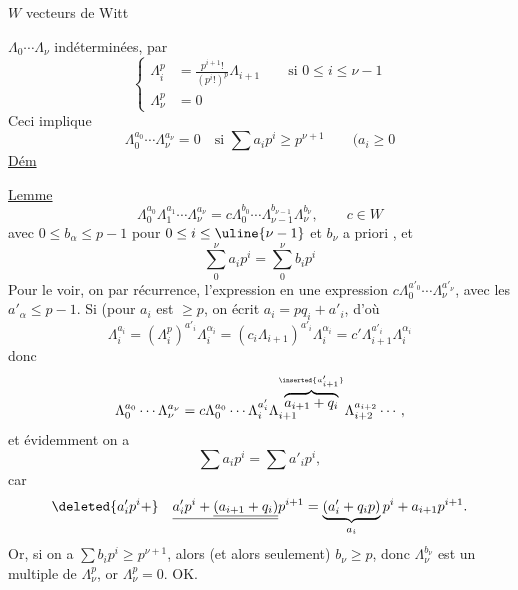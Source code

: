 $W$ vecteurs de Witt

$\Lambda_0\cdots\Lambda_\nu$ indéterminées,  par
\[
\left\{\begin{aligned}
\Lambda_i^p&=\frac{p^{i+1}!}{(p^i!)^p}\Lambda_{i+1}\qquad\text{si }0\leq i\leq\nu-1\\
\Lambda_\nu^p&=0
\end{aligned}\right.
\]
Ceci implique
\[
\Lambda_0^{a_0}\cdots\Lambda_\nu^{a_\nu}=0\quad\text{si }\sum a_ip^i\geq p^{\nu+1}\qquad(a_i\geq0
\]
 \uline{Dém} 

 

\uline{Lemme}
\[
\Lambda_0^{a_0}\Lambda_1^{a_1}\cdots\Lambda_\nu^{a_\nu}=c\Lambda_0^{b_0}\cdots\Lambda_{\nu-1}^{b_{\nu-1}}\Lambda_\nu^{b_\nu},\qquad c\in W
\]
avec $0\leq b_\alpha\leq p-1$ pour $0\leq i\leq\uline{\nu-1}$ et $b_\nu$ a priori , et
\[
\sum_0^\nu a_ip^i=\sum_0^\nu b_ip^i
\]
Pour le voir, on  par récurrence,   l'expression en une expression $c\Lambda_0^{a'_0}\cdots\Lambda_\nu^{a'_\nu}$, avec les $a'_\alpha\leq p-1$.
 
 
Si  (pour $a_i$  est $\geq p$, on écrit $a_i=pq_i+a'_i$, d'où
\[
\Lambda_i^{a_i}=(\Lambda_i^p)^{a'_i}\Lambda_i^{\alpha_i}=(c_i\Lambda_{i+1})^{a'_i}\Lambda_i^{\alpha_i}=c'\Lambda_{i+1}^{a'_i}\Lambda_i^{\alpha_i}
\]
donc
\[
\Lambda_0^{a_0}\cdots\Lambda_\nu^{a_\nu}=c\Lambda_0^{a_0}\cdots\Lambda_i^{a'_i}\Lambda_{i+1}^{\overbrace{a_{i+1}+q_i}^{\inserted{a'_{i+1}}}}\Lambda_{i+2}^{a_{i+2}}\cdots,
\]
et évidemment on a
\[
\sum a_ip^i=\sum a'_ip^i,
\]
car
\[
\deleted{a'_ip^i+}\quad\underline{a'_ip^i+\underline{(a_{i+1}+q_i)}}p^{i+1}=\underbrace{(a'_i+q_ip)}_{a_i}p^i+a_{i+1}p^{i+1}.
\]
Or, si on a $\sum b_ip^i\geq p^{\nu+1}$, alors  (et alors seulement)  $b_\nu\geq p$, donc $\Lambda_\nu^{b_\nu}$ est un  multiple de $\Lambda_\nu^p$, or $\Lambda_\nu^p=0$. OK.
